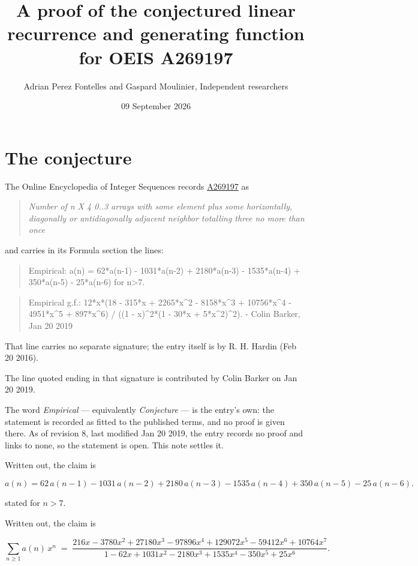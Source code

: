 \documentclass[11pt]{article}
\title{A proof of the conjectured linear recurrence and generating function for OEIS A269197}
\author{Adrian Perez Fontelles and Gaspard Moulinier, Independent researchers}
\date{09 September 2026}
\theoremstyle{definition}
\begin{document}
\maketitle
\section{The conjecture}

The Online Encyclopedia of Integer Sequences records \href{https://oeis.org/A269197}{A269197} as

\begin{quote}\itshape Number of n X 4 0..3 arrays with some element plus some horizontally, diagonally or antidiagonally adjacent neighbor totalling three no more than once\end{quote}

and carries in its Formula section the lines:

\begin{quote}\ttfamily Empirical: a(n) = 62*a(n-1) - 1031*a(n-2) + 2180*a(n-3) - 1535*a(n-4) + 350*a(n-5) - 25*a(n-6) for n>7.\end{quote}

\begin{quote}\ttfamily Empirical g.f.: 12*x*(18 - 315*x + 2265*x\textasciicircum{}2 - 8158*x\textasciicircum{}3 + 10756*x\textasciicircum{}4 - 4951*x\textasciicircum{}5 + 897*x\textasciicircum{}6) / ((1 - x)\textasciicircum{}2*(1 - 30*x + 5*x\textasciicircum{}2)\textasciicircum{}2). - Colin Barker, Jan 20 2019\end{quote}

That line carries no separate signature; the entry itself is by R. H. Hardin (Feb 20 2016).

The line quoted ending in that signature is contributed by Colin Barker on Jan 20 2019.

The word {\itshape Empirical} --- equivalently {\itshape Conjecture} --- is the entry's own: the statement is recorded as fitted to the published terms, and no proof is given there. As of revision 8, last modified Jan 20 2019, the entry records no proof and links to none, so the statement is open. This note settles it.

Written out, the claim is

\[a(n) = 62\,a(n-1) - 1031\,a(n-2) + 2180\,a(n-3) - 1535\,a(n-4) + 350\,a(n-5) - 25\,a(n-6).\]

stated for $n > 7$.

Written out, the claim is

\[\sum_{n \ge 1} a(n)\,x^n \;=\; \frac{216x - 3780x^{2} + 27180x^{3} - 97896x^{4} + 129072x^{5} - 59412x^{6} + 10764x^{7}}{1 - 62x + 1031x^{2} - 2180x^{3} + 1535x^{4} - 350x^{5} + 25x^{6}}.\]
\end{document}
